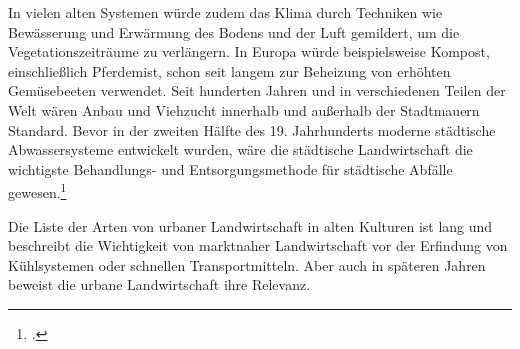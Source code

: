 \documentclass{scrartcl}
\begin{document}
In vielen alten Systemen würde zudem das Klima durch Techniken wie Bewässerung und Erwärmung des Bodens und der Luft gemildert, um die Vegetationszeiträume zu verlängern. In Europa würde beispielsweise Kompost, einschließlich Pferdemist, schon seit langem zur Beheizung von erhöhten Gemüsebeeten verwendet. Seit hunderten Jahren und in verschiedenen Teilen der Welt wären Anbau und Viehzucht innerhalb und außerhalb der Stadtmauern Standard. Bevor in der zweiten Hälfte des 19. Jahrhunderts moderne städtische Abwassersysteme entwickelt wurden, wäre die städtische Landwirtschaft die wichtigste Behandlungs- und Entsorgungsmethode für städtische Abfälle gewesen.\footcite[Vgl.][S. 6-7]{Smit2001UrbanCities}

Die Liste der Arten von urbaner Landwirtschaft in alten Kulturen ist lang und beschreibt die Wichtigkeit von marktnaher Landwirtschaft vor der Erfindung von Kühlsystemen oder schnellen Transportmitteln. Aber auch in späteren Jahren beweist die urbane Landwirtschaft ihre Relevanz.
\end{document}
